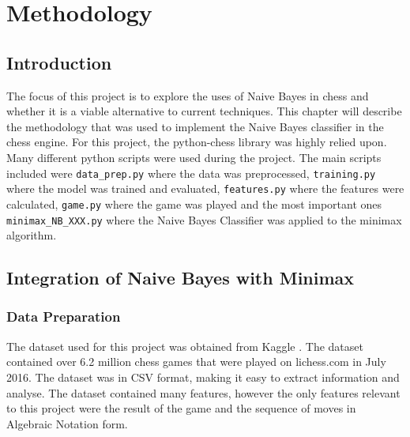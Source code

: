 \chapter{Methodology}

\section{Introduction}
The focus of this project is to explore the uses of Naive Bayes in chess and whether it is a viable alternative to current techniques. This chapter will describe the methodology that was used to implement the Naive Bayes classifier in the chess engine. For this project, the python-chess library was highly relied upon. Many different python scripts were used during the project. The main scripts included were \texttt{data\_prep.py} where the data was preprocessed, \texttt{training.py} where the model was trained and evaluated, \texttt{features.py} where the features were calculated, \texttt{game.py} where the game was played and the most important ones \texttt{minimax\_NB\_XXX.py} where the Naive Bayes Classifier was applied to the minimax algorithm.


\section{Integration of Naive Bayes with Minimax}

\subsection{Data Preparation}

The dataset used for this project was obtained from Kaggle \cite{ChessGameDataset}. The dataset contained over 6.2 million chess games that were played on lichess.com in July 2016. The dataset was in CSV format, making it easy to extract information and analyse. The dataset contained many features, however the only features relevant to this project were the result of the game and the sequence of moves in Algebraic Notation form.

